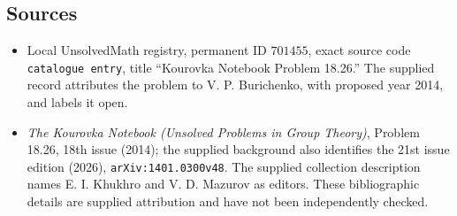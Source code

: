 \documentclass[11pt]{article}
\begin{document}
\subsection{Sources}
\begin{itemize}
\item Local UnsolvedMath registry, permanent ID \(701455\), exact source code \texttt{catalogue entry}, title ``Kourovka Notebook Problem 18.26.'' The supplied record attributes the problem to V. P. Burichenko, with proposed year 2014, and labels it open.
\item \emph{The Kourovka Notebook (Unsolved Problems in Group Theory)}, Problem 18.26, 18th issue (2014); the supplied background also identifies the 21st issue edition (2026), \texttt{arXiv:1401.0300v48}. The supplied collection description names E. I. Khukhro and V. D. Mazurov as editors. These bibliographic details are supplied attribution and have not been independently checked.
\end{itemize}
\end{document}
